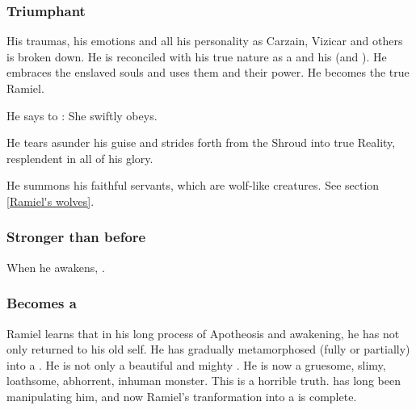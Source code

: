 \subsubsection{Triumphant}
His traumas, his emotions and all his personality as Carzain, Vizicar and others is broken down. 
He is reconciled with his true nature as a \sathariah{} and his \malach{}  (and ).  
He embraces the enslaved souls and uses them and their power. 
He becomes the true Ramiel. 

He says to \Cishiel:
She swiftly obeys. 


He tears asunder his \human{} guise and strides forth from the Shroud into true Reality, resplendent in all of his \sathariah{} glory. 

He summons his faithful servants, which are wolf-like creatures. See section \ref{Ramiel's wolves}. 





\subsubsection{Stronger than before}
When he awakens, . 





\subsubsection{Becomes a \neoresphan}
Ramiel learns that in his long process of Apotheosis and awakening, he has not only returned to his old self. 
He has gradually metamorphosed (fully or partially) into a \neoresphan.
He is not only a beautiful and mighty \resphan. 
He is now a gruesome, slimy, loathsome, abhorrent, inhuman monster. 
This is a horrible truth. 
\Azraid has long been manipulating him, and now Ramiel's tranformation into a \neoresphan is complete. 

